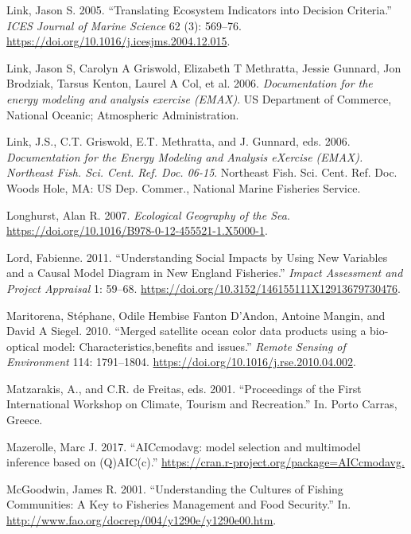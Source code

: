 \documentclass[
]{book}
\begin{document}
\leavevmode\hypertarget{ref-link_translating_2005}{}%
Link, Jason S. 2005. ``Translating Ecosystem Indicators into Decision Criteria.'' \emph{ICES Journal of Marine Science} 62 (3): 569--76. \url{https://doi.org/10.1016/j.icesjms.2004.12.015}.

\leavevmode\hypertarget{ref-link2006EMAX}{}%
Link, Jason S, Carolyn A Griswold, Elizabeth T Methratta, Jessie Gunnard, Jon Brodziak, Tarsus Kenton, Laurel A Col, et al. 2006. \emph{Documentation for the energy modeling and analysis exercise (EMAX)}. US Department of Commerce, National Oceanic; Atmospheric Administration.

\leavevmode\hypertarget{ref-link_documentation_2006}{}%
Link, J.S., C.T. Griswold, E.T. Methratta, and J. Gunnard, eds. 2006. \emph{Documentation for the Energy Modeling and Analysis eXercise (EMAX). Northeast Fish. Sci. Cent. Ref. Doc. 06-15}. Northeast Fish. Sci. Cent. Ref. Doc. Woods Hole, MA: US Dep. Commer., National Marine Fisheries Service.

\leavevmode\hypertarget{ref-Longhurst2007}{}%
Longhurst, Alan R. 2007. \emph{Ecological Geography of the Sea}. \url{https://doi.org/10.1016/B978-0-12-455521-1.X5000-1}.

\leavevmode\hypertarget{ref-lord_understanding_2011}{}%
Lord, Fabienne. 2011. ``Understanding Social Impacts by Using New Variables and a Causal Model Diagram in New England Fisheries.'' \emph{Impact Assessment and Project Appraisal} 1: 59--68. \url{https://doi.org/10.3152/146155111X12913679730476}.

\leavevmode\hypertarget{ref-Maritorena2010}{}%
Maritorena, Stéphane, Odile Hembise Fanton D'Andon, Antoine Mangin, and David A Siegel. 2010. ``Merged satellite ocean color data products using a bio-optical model: Characteristics,benefits and issues.'' \emph{Remote Sensing of Environment} 114: 1791--1804. \url{https://doi.org/10.1016/j.rse.2010.04.002}.

\leavevmode\hypertarget{ref-matzarakis_proceedings_2001}{}%
Matzarakis, A., and C.R. de Freitas, eds. 2001. ``Proceedings of the First International Workshop on Climate, Tourism and Recreation.'' In. Porto Carras, Greece.

\leavevmode\hypertarget{ref-Mazerolle2017a}{}%
Mazerolle, Marc J. 2017. ``AICcmodavg: model selection and multimodel inference based on (Q)AIC(c).'' \url{https://cran.r-project.org/package=AICcmodavg.}

\leavevmode\hypertarget{ref-mcgoodwin_understanding_2001}{}%
McGoodwin, James R. 2001. ``Understanding the Cultures of Fishing Communities: A Key to Fisheries Management and Food Security.'' In. \url{http://www.fao.org/docrep/004/y1290e/y1290e00.htm}.
\end{document}
